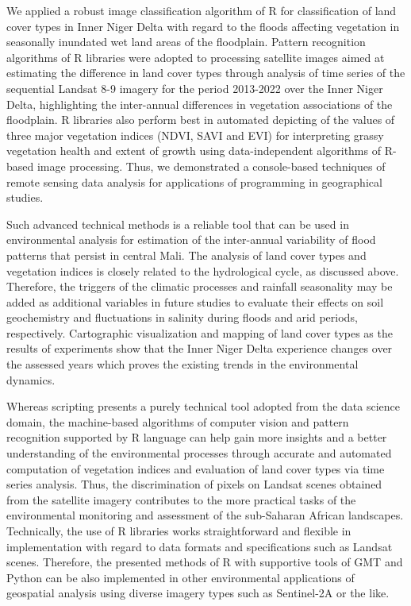 \documentclass[12pt,a4paper,oneside]{article}
\def \newpar{\vspace{6pt}}
\begin{document}
\newpar We applied a robust image classification algorithm of R for classification of land cover types in Inner Niger Delta with regard to the floods affecting vegetation in seasonally inundated wet land areas of the floodplain. Pattern recognition algorithms of R libraries were adopted to processing satellite images aimed at estimating the difference in land cover types through analysis of time series of the sequential Landsat 8-9 imagery for the period 2013-2022 over the Inner Niger Delta, highlighting the inter-annual differences in vegetation associations of the floodplain. R libraries also perform best in automated depicting of the values of three major vegetation indices (NDVI, SAVI and EVI) for interpreting grassy vegetation health and extent of growth using data-independent algorithms of R-based image processing. Thus, we demonstrated a console-based techniques of remote sensing data analysis for applications of programming in geographical studies. 

\newpar Such advanced technical methods is a reliable tool that can be used in environmental analysis for estimation of the inter-annual variability of flood patterns that persist in central Mali. The analysis of land cover types and vegetation indices is closely related to the hydrological cycle, as discussed above. Therefore, the triggers of the climatic processes and rainfall seasonality may be added as additional variables in future studies to evaluate their effects on soil geochemistry and fluctuations in salinity during floods and arid periods, respectively. Cartographic visualization and mapping of land cover types as the results of experiments show that the Inner Niger Delta experience changes over the assessed years which proves the existing trends in the environmental dynamics.  

\newpar Whereas scripting presents a purely technical tool adopted from the data science domain, the machine-based algorithms of computer vision and pattern recognition supported by R language can help gain more insights and a better understanding of the environmental processes through accurate and automated computation of vegetation indices and evaluation of land cover types via time series analysis. Thus, the discrimination of pixels on Landsat scenes obtained from the satellite imagery contributes to the more practical tasks of the environmental monitoring and assessment of the sub-Saharan African landscapes. Technically, the use of R libraries works straightforward and flexible in implementation with regard to data formats and specifications such as Landsat scenes. Therefore, the presented methods of R with supportive tools of GMT and Python can be also implemented in other environmental applications of geospatial analysis using diverse imagery types such as Sentinel-2A or the like. 
\end{document}
